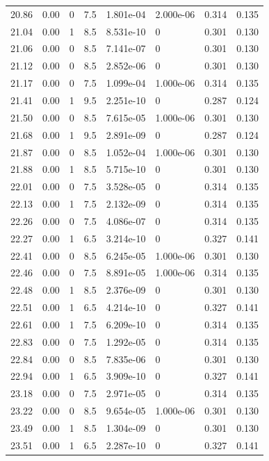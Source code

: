 \documentclass[preview]{standalone}
\begin{document}
{{{{{{\begin{tabular}{L{1.2cm}C{1.2cm} C{0.3cm}C{0.5cm} C{1.4cm}C{1.4cm} C{1.4cm}C{1.4cm}}
  20.86  &  0.00  & 0     & 7.5 &  1.801e-04  & 2.000e-06  & 0.314 &  0.135   \\ 
  21.04  &  0.00  & 1     & 8.5 &  8.531e-10  & 0  & 0.301 &  0.130   \\ 
  21.06  &  0.00  & 0     & 8.5 &  7.141e-07  & 0  & 0.301 &  0.130   \\ 
  21.12  &  0.00  & 0     & 8.5 &  2.852e-06  & 0  & 0.301 &  0.130   \\ 
  21.17  &  0.00  & 0     & 7.5 &  1.099e-04  & 1.000e-06  & 0.314 &  0.135   \\ 
  21.41  &  0.00  & 1     & 9.5 &  2.251e-10  & 0  & 0.287 &  0.124   \\ 
  21.50  &  0.00  & 0     & 8.5 &  7.615e-05  & 1.000e-06  & 0.301 &  0.130   \\ 
  21.68  &  0.00  & 1     & 9.5 &  2.891e-09  & 0  & 0.287 &  0.124   \\ 
  21.87  &  0.00  & 0     & 8.5 &  1.052e-04  & 1.000e-06  & 0.301 &  0.130   \\ 
  21.88  &  0.00  & 1     & 8.5 &  5.715e-10  & 0  & 0.301 &  0.130   \\ 
  22.01  &  0.00  & 0     & 7.5 &  3.528e-05  & 0  & 0.314 &  0.135   \\ 
  22.13  &  0.00  & 1     & 7.5 &  2.132e-09  & 0  & 0.314 &  0.135   \\ 
  22.26  &  0.00  & 0     & 7.5 &  4.086e-07  & 0  & 0.314 &  0.135   \\ 
  22.27  &  0.00  & 1     & 6.5 &  3.214e-10  & 0  & 0.327 &  0.141   \\ 
  22.41  &  0.00  & 0     & 8.5 &  6.245e-05  & 1.000e-06  & 0.301 &  0.130   \\ 
  22.46  &  0.00  & 0     & 7.5 &  8.891e-05  & 1.000e-06  & 0.314 &  0.135   \\ 
  22.48  &  0.00  & 1     & 8.5 &  2.376e-09  & 0  & 0.301 &  0.130   \\ 
  22.51  &  0.00  & 1     & 6.5 &  4.214e-10  & 0  & 0.327 &  0.141   \\ 
  22.61  &  0.00  & 1     & 7.5 &  6.209e-10  & 0  & 0.314 &  0.135   \\ 
  22.83  &  0.00  & 0     & 7.5 &  1.292e-05  & 0  & 0.314 &  0.135   \\ 
  22.84  &  0.00  & 0     & 8.5 &  7.835e-06  & 0  & 0.301 &  0.130   \\ 
  22.94  &  0.00  & 1     & 6.5 &  3.909e-10  & 0  & 0.327 &  0.141   \\ 
  23.18  &  0.00  & 0     & 7.5 &  2.971e-05  & 0  & 0.314 &  0.135   \\ 
  23.22  &  0.00  & 0     & 8.5 &  9.654e-05  & 1.000e-06  & 0.301 &  0.130   \\ 
  23.49  &  0.00  & 1     & 8.5 &  1.304e-09  & 0  & 0.301 &  0.130   \\ 
  23.51  &  0.00  & 1     & 6.5 &  2.287e-10  & 0  & 0.327 &  0.141   \\ 
\hline 
\end{tabular} 

}}}}}}
\end{document}
